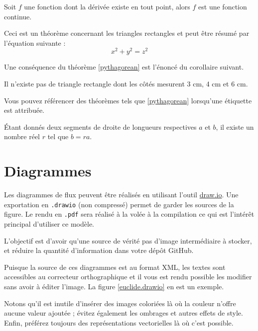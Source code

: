 \begin{theorem}
    Soit $f$ une fonction dont la dérivée existe en tout point, alors $f$ est une fonction continue.
\end{theorem}

\begin{theorem}
    \label{pythagorean}
    Ceci est un théorème concernant les triangles rectangles et peut être résumé par l'équation suivante :
    \[ x^2 + y^2 = z^2 \]
\end{theorem}

Une conséquence du théorème \ref{pythagorean} est l'énoncé du corollaire suivant.

\begin{corollary}
    Il n'existe pas de triangle rectangle dont les côtés mesurent 3 cm, 4 cm et 6 cm.
\end{corollary}

Vous pouvez référencer des théorèmes tels que \ref{pythagorean} lorsqu'une étiquette est attribuée.

\begin{lemma}
    Étant donnés deux segments de droite de longueurs respectives $a$ et $b$, il existe un nombre réel $r$ tel que $b = ra$.
\end{lemma}


\section{Diagrammes}

Les diagrammes de flux peuvent être réalisés en utilisant l'outil \href{https://app.diagrams.net/}{draw.io}. Une exportation en \texttt{.drawio} (non compressé) permet de garder les sources de la figure. Le rendu en \texttt{.pdf} sera réalisé à la volée à la compilation ce qui est l'intérêt principal d'utiliser ce modèle.

L'objectif est d'avoir qu'une source de vérité \cad pas d'image intermédiaire à stocker, et réduire la quantité d'information dans votre dépôt GitHub.

Puisque la source de ces diagrammes est au format XML, les textes sont accessibles au correcteur orthographique et il vous est rendu possible les modifier sans avoir à éditer l'image. La figure \ref{euclide.drawio} en est un exemple.


Notons qu'il est inutile d'insérer des images coloriées là où la couleur n'offre aucune valeur ajoutée ; évitez également les ombrages et autres effets de style. Enfin, préférez toujours des représentations vectorielles là où c'est possible.

